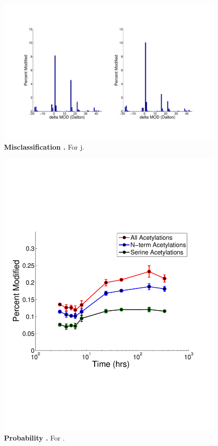 \documentclass[12pt]{article}
\begin{document}
\clearpage
\begin{figure}[!ht]
\centerline{\includegraphics[width=8in]{Figures/PTMdalton.pdf}}
\caption{\label{fig:misclassification}\textbf{Misclassification .} For j.}
\end{figure}

\clearpage
\begin{figure}[p]
\centerline{\includegraphics[width=5in]{Figures/Acetylation_AAs.pdf}}
\caption{\label{fig:heat_map}\textbf{Probability .} For .}
\end{figure}
\end{document}
